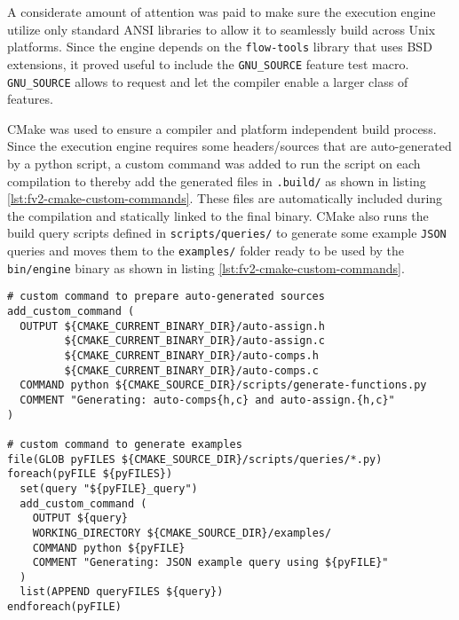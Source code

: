 A considerate amount of attention was paid to make sure the execution engine
utilize only standard ANSI libraries to allow it to seamlessly build
 across Unix platforms. Since the engine
depends on the \texttt{flow-tools} library that uses BSD extensions, it proved
useful to include the \texttt{GNU\_SOURCE} feature test macro.
\texttt{GNU\_SOURCE} allows to request and let the compiler enable a larger
class of features.

CMake was used to ensure a compiler and platform independent build process.
Since the execution engine requires some headers/sources that are
auto-generated by a python script, a custom command was added to run the
script on each compilation to thereby add the generated files  in \texttt{.build/} as shown in listing
\ref{lst:fv2-cmake-custom-commands}. These files are automatically included
during the compilation and statically linked to the final binary.  CMake also
runs the build query scripts defined in \texttt{scripts/queries/} to generate
some example \texttt{JSON} queries and moves them to the \texttt{examples/}
folder ready to be used by the \texttt{bin/engine} binary as shown in listing
\ref{lst:fv2-cmake-custom-commands}.

\begin{lstlisting}
# custom command to prepare auto-generated sources
add_custom_command (
  OUTPUT ${CMAKE_CURRENT_BINARY_DIR}/auto-assign.h
         ${CMAKE_CURRENT_BINARY_DIR}/auto-assign.c
         ${CMAKE_CURRENT_BINARY_DIR}/auto-comps.h
         ${CMAKE_CURRENT_BINARY_DIR}/auto-comps.c
  COMMAND python ${CMAKE_SOURCE_DIR}/scripts/generate-functions.py
  COMMENT "Generating: auto-comps{h,c} and auto-assign.{h,c}"
)

# custom command to generate examples
file(GLOB pyFILES ${CMAKE_SOURCE_DIR}/scripts/queries/*.py)
foreach(pyFILE ${pyFILES})
  set(query "${pyFILE}_query")
  add_custom_command (
    OUTPUT ${query}
    WORKING_DIRECTORY ${CMAKE_SOURCE_DIR}/examples/
    COMMAND python ${pyFILE}
    COMMENT "Generating: JSON example query using ${pyFILE}"
  )
  list(APPEND queryFILES ${query})
endforeach(pyFILE)
\end{lstlisting}

